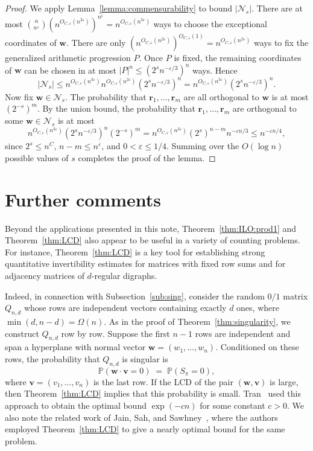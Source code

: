 \documentclass[reqno]{amsart}
\renewcommand\P{{\mathbb{P}}}
\newcommand\eps{{\varepsilon}}
\newcommand\BMr{{\bm r}}
\newcommand\BMv{{\bm v}}
\newcommand\BMw{{\bm w}}
\newcommand\CN{{\mathcal N}}
\theoremstyle{plain}
\theoremstyle{definition}
\begin{document}
\begin{proof}
We apply Lemma~\ref{lemma:commensurability} to bound $|\CN_s|$. 
There are at most
$\binom{n}{n^{\eps}}(n^{O_{C,\eps}(n^{2\eps})})^{n^{\eps}}
= n^{O_{C,\eps}(n^{3\eps})}$
ways to choose the exceptional coordinates of $\BMw$.
There are only 
$(n^{O_{C,\eps}(n^{2\eps})})^{O_{C,\eps}(1)}
= n^{O_{C,\eps}(n^{2\eps})}$
ways to fix the generalized arithmetic progression $P$. 
Once $P$ is fixed, the remaining coordinates of $\BMw$ can be chosen in at most 
$|P|^{n}\le (2^{s}n^{-\eps/3})^{n}$ ways. 
Hence
\[
|\CN_s|
\le n^{O_{C,\eps}(n^{3\eps})}n^{O_{C,\eps}(n^{2\eps})}(2^{s}n^{-\eps/3})^{n}
= n^{O_{C,\eps}(n^{3\eps})}(2^{s}n^{-\eps/3})^{n}.
\]
Now fix $\BMw\in\CN_s$. The probability that $\BMr_1,\ldots,\BMr_m$
are all orthogonal to $\BMw$ is at most $(2^{-s})^m$. By the union bound,
the probability that $\BMr_1,\ldots,\BMr_m$ are orthogonal to some
$\BMw\in\CN_s$ is at most
\[
n^{O_{C,\eps}(n^{3\eps})}(2^{s}n^{-\eps/3})^{n}(2^{-s})^{m}
= n^{O_{C,\eps}(n^{3\eps})}(2^{s})^{n-m} n^{-\eps n/3}
\le n^{-\eps n/4},
\]
since $2^s\le n^{C}$, $n-m\le n^{\eps}$, and $0<\eps\le 1/4$.
Summing over the $O(\log n)$ possible values of $s$ completes the proof of the lemma.
\end{proof}




\section{Further comments}\label{section:comments} 

Beyond the applications presented in this note, Theorem~\ref{thm:ILO:prod1} and
Theorem~\ref{thm:LCD} also appear to be useful in a variety of counting problems.
For instance, Theorem~\ref{thm:LCD} is a key tool for establishing strong quantitative
invertibility estimates for matrices with fixed row sums and for adjacency matrices of
\(d\)-regular digraphs.

Indeed, in connection with Subsection~\ref{sub:sing}, consider the random \(0/1\) matrix
\(Q_{n,d}\) whose rows are independent vectors containing exactly \(d\) ones, where
\(\min(d,n-d)=\Omega(n)\). As in the proof of Theorem~\ref{thm:singularity}, we
construct \(Q_{n,d}\) row by row. Suppose the first \(n-1\) rows are independent and span
a hyperplane with normal vector \(\BMw=(w_1,\ldots,w_n)\). Conditioned on these rows,
the probability that \(Q_{n,d}\) is singular is
\[
\P(\BMw\cdot \BMv = 0) \;=\; \P(S_{\pi}=0),
\]
where \(\BMv=(v_1,\ldots,v_n)\) is the last row. If the LCD of the pair \((\BMw,\BMv)\)
is large, then Theorem~\ref{thm:LCD} implies that this probability is small. Tran~\cite{Tran}
used this approach to obtain the optimal bound \(\exp(-cn)\) for some constant \(c>0\).
We also note the related work of Jain, Sah, and Sawhney~\cite{JSS22}, where the authors
employed Theorem~\ref{thm:LCD} to give a nearly optimal bound for the same problem.
\end{document}
